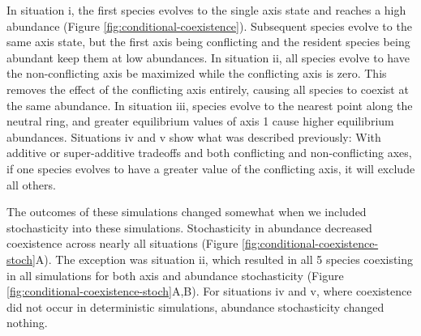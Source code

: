 In situation i, the first species evolves to the single
axis state and reaches a high abundance (Figure
\ref{fig:conditional-coexistence}).
Subsequent species evolve to the same axis state, but the first axis
being conflicting and the resident species being abundant keep them
at low abundances.
In situation ii, all species evolve to have the non-conflicting axis
be maximized while the conflicting axis is zero.
This removes the effect of the conflicting axis entirely, causing all
species to coexist at the same abundance.
In situation iii, species evolve to the nearest point along the
neutral ring, and greater equilibrium values of axis 1 cause
higher equilibrium abundances.
Situations iv and v show what was described previously:
With additive or super-additive tradeoffs and both conflicting
and non-conflicting axes, if one species evolves to have a greater
value of the conflicting axis, it will exclude all others.




The outcomes of these simulations changed somewhat when we included stochasticity
into these simulations.
Stochasticity in abundance decreased coexistence across nearly all situations
(Figure \ref{fig:conditional-coexistence-stoch}A).
The exception was situation ii, which resulted in all 5 species coexisting 
in all simulations for both axis and abundance stochasticity
(Figure \ref{fig:conditional-coexistence-stoch}A,B).
For situations iv and v, where coexistence did not occur in deterministic
simulations, abundance stochasticity changed nothing.

